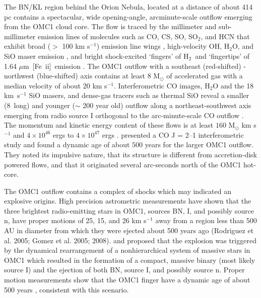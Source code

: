 \documentclass[12pt,preprint]{aastex}
\newcommand{\Feii}{[Fe~{\sc ii}]}
\newcommand{\um}{$\mu$m}
\newcommand{\hh}{\ensuremath{\textrm{H}_{2}}}			%
\begin{document}
The BN/KL region behind the Orion Nebula, located at a distance of about
414 pc \citep{Menten2007} contains a spectacular, 
wide opening-angle, arcminute-scale  outflow emerging from the
OMC1 cloud core.  The flow is traced by the millimeter and
sub-millimeter emission lines of molecules 
such as CO, CS, SO, SO$_2$, and HCN  that exhibit  broad  
($>$ 100 km s$^{-1}$)  emission line wings 
\citep{KwanScoville1976, WisemanHo1996, FuruyaShinnaga2009},  
high-velocity OH, H$_2$O,  and SiO maser  emission \citep{Genzel1981,Greenhill1998}, 
and bright shock-excited `fingers' of  \hh\   and `fingertips' of 1.64 \um\  \Feii\   emission
\citep{AllenBurton93, Bally2011}.    The OMC1 outflow with a southeast 
(red-shifted) - northwest (blue-shifted) axis
contains  at least 8 M$_{\odot}$ of  accelerated gas with a median velocity of about 
20 km s$^{-1}$.     Interferometric CO images, H$_2$O and the 18 km~s$^{-1}$ 
SiO masers,  and dense-gas tracers such as  thermal SiO reveal a 
smaller (8\arcsec\  long) and younger ($\sim$ 200 
year old) outflow along a  northeast-southwest axis emerging from radio source I  
orthogonal to the arc-minute-scale  CO outflow  \citep{BeutherNissen2008,Plambeck2009}.    
The  momentum and kinetic   energy content of these flows is at least  
$160$ M$_{\odot}$ km s$^{-1}$ and  $4 \times 10^{46}$  ergs  \citep{Snell1984} to  
$4 \times 10^{47}$ ergs  \citep{KwanScoville1976}.     \citet{Zapata2009}  presented a
CO J = 2--1 interferometric study and found a dynamic age of  about $500$ 
years for the larger OMC1 outflow.   They noted its impulsive nature, that its  structure is 
different from accretion-disk  powered  flows,  and that it  originated several arc-seconds 
north of the  OMC1 hot-core.   

The OMC1 outflow  contains  a complex of shocks which may indicated an explosive
origins.     High precision astrometric measurements have shown that
the three brightest radio-emitting stars in OMC1, sources BN, I, and possibly
source n, have  proper motions  of 25, 15, and 26 km s$^{-1}$ 
away from a region less than 500 AU in diameter from which they were ejected 
about  500 years ago (Rodriguez et al. 2005; Gomez et al. 2005; 2008).   
\citet{Bally2011} and \citet{Goddi2011} proposed that the explosion was triggered 
by the dynamical rearrangement of a nonhierarchical system of massive stars in 
OMC1 which resulted in the formation of a compact, massive binary (most likely 
source I) and the ejection of both BN,   source I, and possibly source n.  
Proper motion measurements show that the OMC1 finger have a dynamic age
of about 500 years \citep{Bally2011}, consistent with this scenario.   
\end{document}
